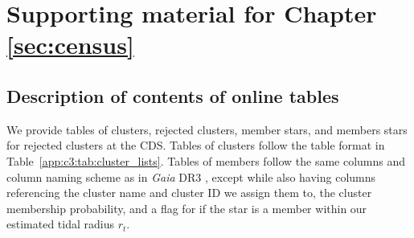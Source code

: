 \begin{table}
\begin{tabular}{cccc|cccc}
\hline

\end{tabular}

\normalsize


\end{table}


\clearpage


\chapter{Supporting material for Chapter \ref{sec:census}}

\section{Description of contents of online tables}\label{app:c3:tables}

We provide tables of clusters, rejected clusters, member stars, and members stars for rejected clusters at the CDS. Tables of clusters follow the table format in Table~\ref{app:c3:tab:cluster_lists}. Tables of members follow the same columns and column naming scheme as in \emph{Gaia} DR3 \citep{gaia_collaboration_gaia_2022}, except while also having columns referencing the cluster name and cluster ID we assign them to, the cluster membership probability, and a flag for if the star is a member within our estimated tidal radius $r_t$.


